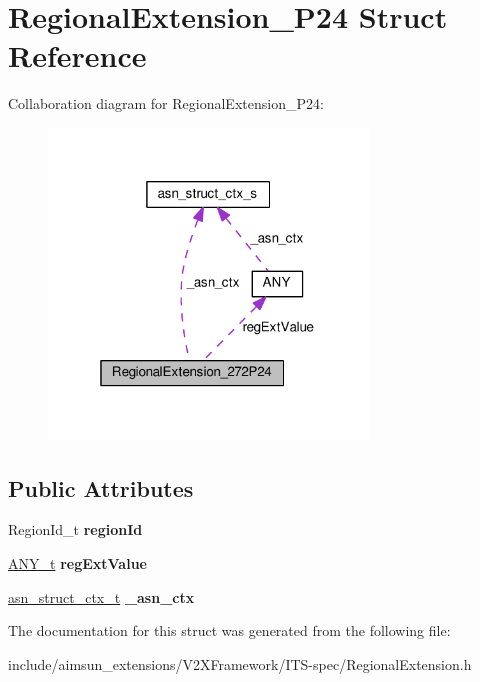 \hypertarget{structRegionalExtension__272P24}{}\section{Regional\+Extension\+\_\+P24 Struct Reference}
\label{structRegionalExtension__272P24}


Collaboration diagram for Regional\+Extension\+\_\+P24\+:\nopagebreak
\begin{figure}[H]
\begin{center}
\leavevmode
\includegraphics[width=241pt]{structRegionalExtension__272P24__coll__graph}
\end{center}
\end{figure}
\subsection*{Public Attributes}
\begin{DoxyCompactItemize}
\item 
Region\+Id\+\_\+t {\bfseries region\+Id}\hypertarget{structRegionalExtension__272P24_a4134102bcd824e18d56320d4bae7781b}{}\label{structRegionalExtension__272P24_a4134102bcd824e18d56320d4bae7781b}

\item 
\hyperlink{structANY}{A\+N\+Y\+\_\+t} {\bfseries reg\+Ext\+Value}\hypertarget{structRegionalExtension__272P24_a71ee6bea6f29a633897bf85803ea2238}{}\label{structRegionalExtension__272P24_a71ee6bea6f29a633897bf85803ea2238}

\item 
\hyperlink{structasn__struct__ctx__s}{asn\+\_\+struct\+\_\+ctx\+\_\+t} {\bfseries \+\_\+asn\+\_\+ctx}\hypertarget{structRegionalExtension__272P24_a0b11a34713d0f348375775a4d4ce8193}{}\label{structRegionalExtension__272P24_a0b11a34713d0f348375775a4d4ce8193}

\end{DoxyCompactItemize}


The documentation for this struct was generated from the following file\+:\begin{DoxyCompactItemize}
\item 
include/aimsun\+\_\+extensions/\+V2\+X\+Framework/\+I\+T\+S-\/spec/Regional\+Extension.\+h\end{DoxyCompactItemize}
